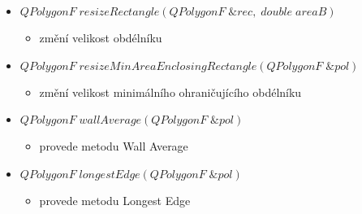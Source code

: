 \documentclass[oneside,12pt,a4paper]{book}
\begin{document}
\begin{itemize}
    \item $QPolygonF\; resizeRectangle(QPolygonF\; \&rec,\; double\; areaB)$
    \begin{itemize}
    \item změní velikost obdélníku
    \end{itemize}
    
    \item $QPolygonF\; resizeMinAreaEnclosingRectangle(QPolygonF\; \&pol)$
    \begin{itemize}
    \item změní velikost minimálního ohraničujícího obdélníku
    \end{itemize}
    
    \item $QPolygonF\; wallAverage(QPolygonF\; \&pol)$
    \begin{itemize}
    \item provede metodu Wall Average
    \end{itemize}
    
    \item $QPolygonF\; longestEdge(QPolygonF\; \&pol)$
    \begin{itemize}
    \item provede metodu Longest Edge
    \end{itemize}
    
    \end{itemize}


\bigskip
\end{document}
